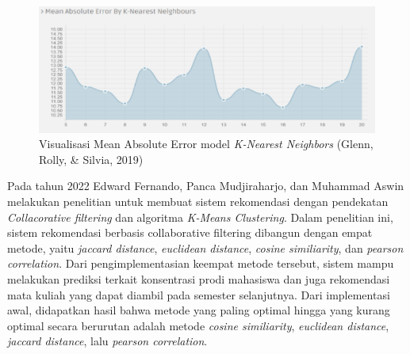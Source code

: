 \begin{figure} [ht] \centering
  \includegraphics{gambar/mae-knn.png}
  \vspace*{3mm}
  \caption{Visualisasi Mean Absolute Error model \emph{K-Nearest Neighbors} {(Glenn, Rolly, \& Silvia, 2019)}}
\end{figure}


Pada tahun 2022 Edward Fernando, Panca Mudjiraharjo, dan Muhammad Aswin melakukan penelitian untuk membuat sistem rekomendasi
dengan pendekatan \emph{Collacorative filtering} dan algoritma \emph{K-Means Clustering}. Dalam penelitian ini, sistem rekomendasi
berbasis collaborative filtering dibangun dengan empat metode, yaitu \emph{jaccard distance}, \emph{euclidean distance}, \emph{cosine similiarity}, dan \emph{pearson correlation}.
Dari pengimplementasian keempat metode tersebut, sistem mampu melakukan prediksi terkait konsentrasi prodi mahasiswa dan juga rekomendasi mata kuliah
yang dapat diambil pada semester selanjutnya. Dari implementasi awal, didapatkan hasil bahwa metode yang paling optimal hingga yang kurang optimal
secara berurutan adalah metode \emph{cosine similiarity}, \emph{euclidean distance}, \emph{jaccard distance}, lalu \emph{pearson correlation}.

